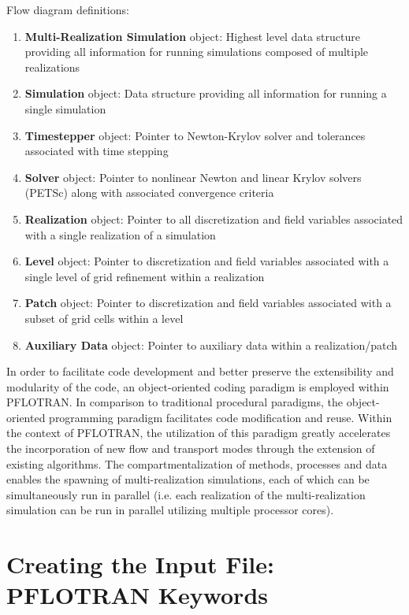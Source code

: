 \documentclass[12pt]{article}
\begin{document}
Flow diagram definitions:
\begin{enumerate}
\item {\bf Multi-Realization Simulation} object: Highest level data structure providing all information for running simulations composed of multiple realizations
\item {\bf Simulation} object: Data structure providing all information for running a single simulation
\item {\bf Timestepper} object: Pointer to Newton-Krylov solver and tolerances associated with time stepping
\item {\bf Solver} object: Pointer to nonlinear Newton and linear Krylov solvers (PETSc) along with associated convergence criteria
\item {\bf Realization} object: Pointer to all discretization and field variables associated with a single realization of a simulation
\item {\bf Level} object: Pointer to discretization and field variables associated with a single level of grid refinement within a realization
\item {\bf Patch} object: Pointer to discretization and field variables associated with a subset of grid cells within a level
\item {\bf Auxiliary Data} object: Pointer to auxiliary data within a realization/patch
\end{enumerate}


In order to facilitate code development and better preserve the extensibility and modularity of the code, an object-oriented coding paradigm is employed within PFLOTRAN.  In comparison to traditional procedural paradigms, the object-oriented programming paradigm facilitates code modification and reuse.  Within the context of PFLOTRAN, the utilization of this paradigm greatly accelerates the incorporation of new flow and transport modes through the extension of existing algorithms.  The compartmentalization of methods, processes and data enables the spawning of multi-realization simulations, each of which can be simultaneously run in parallel (i.e. each realization of the multi-realization simulation can be run in parallel utilizing multiple processor cores).

\newpage



\newpage
\section{Creating the Input File: PFLOTRAN Keywords}
\end{document}
